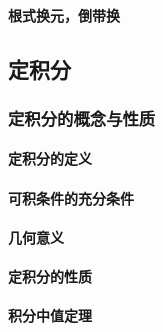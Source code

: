 \documentclass[
]{article}
\begin{document}
\hypertarget{ux6839ux5f0fux6362ux5143ux5012ux5e26ux6362}{%
\paragraph{根式换元，倒带换}\label{ux6839ux5f0fux6362ux5143ux5012ux5e26ux6362}}

\hypertarget{ux5b9aux79efux5206}{%
\subsection{定积分}\label{ux5b9aux79efux5206}}

\hypertarget{ux5b9aux79efux5206ux7684ux6982ux5ff5ux4e0eux6027ux8d28}{%
\subsubsection{定积分的概念与性质}\label{ux5b9aux79efux5206ux7684ux6982ux5ff5ux4e0eux6027ux8d28}}

\hypertarget{ux5b9aux79efux5206ux7684ux5b9aux4e49}{%
\paragraph{定积分的定义}\label{ux5b9aux79efux5206ux7684ux5b9aux4e49}}

\hypertarget{ux53efux79efux6761ux4ef6ux7684ux5145ux5206ux6761ux4ef6}{%
\paragraph{可积条件的充分条件}\label{ux53efux79efux6761ux4ef6ux7684ux5145ux5206ux6761ux4ef6}}

\hypertarget{ux51e0ux4f55ux610fux4e49}{%
\paragraph{几何意义}\label{ux51e0ux4f55ux610fux4e49}}

\hypertarget{ux5b9aux79efux5206ux7684ux6027ux8d28}{%
\paragraph{定积分的性质}\label{ux5b9aux79efux5206ux7684ux6027ux8d28}}

\hypertarget{ux79efux5206ux4e2dux503cux5b9aux7406-1}{%
\paragraph{积分中值定理}\label{ux79efux5206ux4e2dux503cux5b9aux7406-1}}
\end{document}
